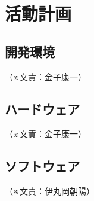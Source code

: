 \documentclass[11pt,a4paper]{report}
\newcommand{\Writer}[1]{
  \normalsize
  \begin{flushright}
    （※文責：#1）
  \end{flushright}
}
\begin{document}
\section{活動計画}\noindent
\subsection{開発環境}
\Writer{金子康一}

\subsection{ハードウェア}
\Writer{金子康一}

\subsection{ソフトウェア}
\Writer{伊丸岡朝陽}
\end{document}
